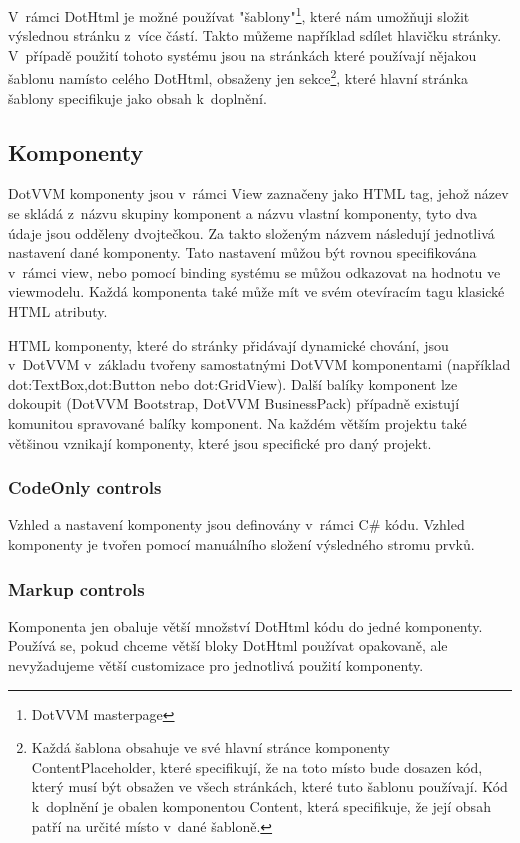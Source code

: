     V~rámci DotHtml je možné používat "šablony"\footnote{DotVVM masterpage}, které nám umožňuji složit výslednou stránku z~více částí. Takto můžeme například sdílet hlavičku stránky. V~případě použití tohoto systému jsou na stránkách které používají nějakou šablonu namísto celého DotHtml, obsaženy jen sekce\footnote{Každá šablona obsahuje ve své hlavní stránce komponenty ContentPlaceholder, které specifikují, že na toto místo bude dosazen kód, který musí být obsažen ve všech stránkách, které tuto šablonu používají. Kód k~doplnění je obalen komponentou Content, která specifikuje, že její obsah patří na určité místo v~dané šabloně.}, které hlavní stránka šablony specifikuje jako obsah k~doplnění.

\subsection*{Komponenty}
DotVVM komponenty jsou v~rámci View zaznačeny jako HTML tag, jehož název se skládá z~názvu skupiny komponent a názvu vlastní komponenty, tyto dva údaje jsou odděleny dvojtečkou. Za takto složeným názvem následují jednotlivá nastavení dané komponenty. Tato nastavení můžou být rovnou specifikována v~rámci view, nebo pomocí binding systému se můžou odkazovat na hodnotu ve viewmodelu. Každá komponenta také může mít ve svém otevíracím tagu klasické HTML atributy. 

HTML komponenty, které do stránky přidávají dynamické chování, jsou v~DotVVM v~základu tvořeny samostatnými DotVVM komponentami (například dot:TextBox,dot:Button nebo dot:GridView). Další balíky komponent lze dokoupit (DotVVM Bootstrap, DotVVM BusinessPack) případně existují komunitou spravované balíky komponent. Na každém větším projektu také většinou vznikají komponenty, které jsou specifické pro daný projekt.

\subsubsection{CodeOnly controls}
Vzhled a nastavení komponenty jsou definovány v~rámci C\# kódu.\newline
Vzhled komponenty je tvořen pomocí manuálního složení výsledného stromu prvků.

\subsubsection{Markup controls}
 Komponenta jen obaluje větší množství DotHtml kódu do jedné komponenty.\newline
 Používá se, pokud chceme větší bloky DotHtml používat opakovaně, ale nevyžadujeme větší customizace pro jednotlivá použití komponenty.
 
